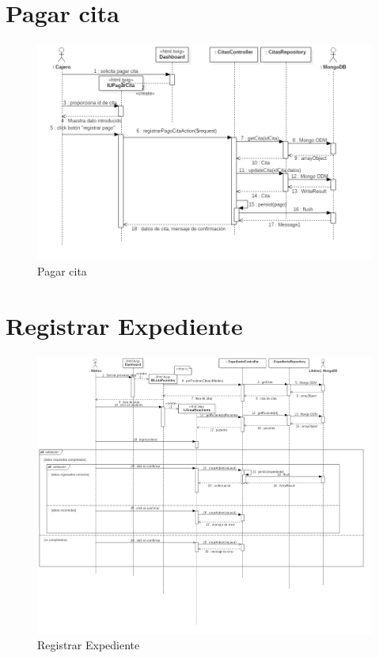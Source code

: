 \newpage
\section{ Pagar cita}

\begin{figure}[htbp!]
	\centering
	\includegraphics[width=1\textwidth]{uml/DiagramasSecuencia/DavidPacheco/pagar-cita}
	\caption{Pagar cita}
\end{figure}
\newpage
\section{ Registrar Expediente}

\begin{figure}[htbp!]
	\centering
	\includegraphics[width=1\textwidth]{uml/DiagramasSecuencia/DavidPacheco/registrar-expediente}
	\caption{Registrar Expediente}
\end{figure}
\newpage
